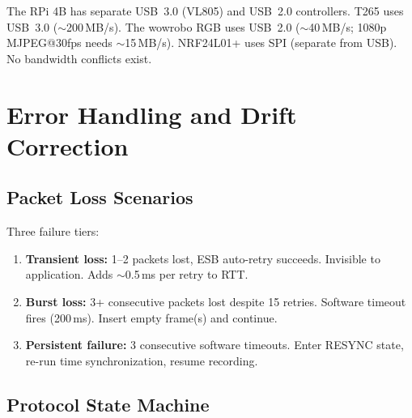 \documentclass[11pt,a4paper]{article}
\begin{document}
\begin{infobox}
The RPi 4B has separate USB~3.0 (VL805) and USB~2.0 controllers. T265 uses USB~3.0 (${\sim}$200\,MB/s). The wowrobo RGB uses USB~2.0 (${\sim}$40\,MB/s; 1080p MJPEG@30fps needs ${\sim}$15\,MB/s). NRF24L01+ uses SPI (separate from USB). No bandwidth conflicts exist.
\end{infobox}


\section{Error Handling and Drift Correction}

\subsection{Packet Loss Scenarios}

Three failure tiers:

\begin{enumerate}
  \item \textbf{Transient loss:} 1--2 packets lost, ESB auto-retry succeeds. Invisible to application. Adds ${\sim}$0.5\,ms per retry to RTT.
  \item \textbf{Burst loss:} 3+ consecutive packets lost despite 15 retries. Software timeout fires (200\,ms). Insert empty frame(s) and continue.
  \item \textbf{Persistent failure:} 3 consecutive software timeouts. Enter RESYNC state, re-run time synchronization, resume recording.
\end{enumerate}

\subsection{Protocol State Machine}
\end{document}
